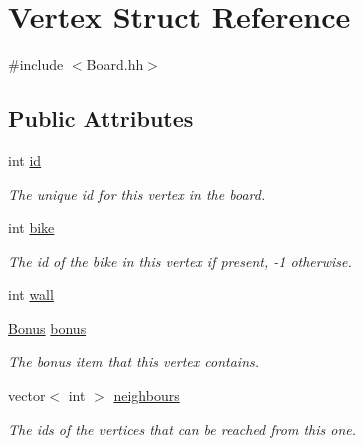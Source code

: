 \hypertarget{structVertex}{}\section{Vertex Struct Reference}
\label{structVertex}


{\ttfamily \#include $<$Board.\+hh$>$}

\subsection*{Public Attributes}
\begin{DoxyCompactItemize}
\item 
int \hyperlink{structVertex_a2e69697726190f50c7fc040fb1ddac7a}{id}\hypertarget{structVertex_a2e69697726190f50c7fc040fb1ddac7a}{}\label{structVertex_a2e69697726190f50c7fc040fb1ddac7a}

\begin{DoxyCompactList}\small\item\em The unique id for this vertex in the board. \end{DoxyCompactList}\item 
int \hyperlink{structVertex_a566d493bf66be66b624d611ef129b417}{bike}\hypertarget{structVertex_a566d493bf66be66b624d611ef129b417}{}\label{structVertex_a566d493bf66be66b624d611ef129b417}

\begin{DoxyCompactList}\small\item\em The id of the bike in this vertex if present, -\/1 otherwise. \end{DoxyCompactList}\item 
int \hyperlink{structVertex_a06820e7fc724eb7e1a3f35df08be1cc6}{wall}
\item 
\hyperlink{Board_8hh_a89fd84d2116e79c08d57dffb6d167ec2}{Bonus} \hyperlink{structVertex_abd0ead532b0acdd9420fb2f46f3e7fcf}{bonus}\hypertarget{structVertex_abd0ead532b0acdd9420fb2f46f3e7fcf}{}\label{structVertex_abd0ead532b0acdd9420fb2f46f3e7fcf}

\begin{DoxyCompactList}\small\item\em The bonus item that this vertex contains. \end{DoxyCompactList}\item 
vector$<$ int $>$ \hyperlink{structVertex_a8a836da794928c52095cb162c79cfade}{neighbours}\hypertarget{structVertex_a8a836da794928c52095cb162c79cfade}{}\label{structVertex_a8a836da794928c52095cb162c79cfade}

\begin{DoxyCompactList}\small\item\em The ids of the vertices that can be reached from this one. \end{DoxyCompactList}\end{DoxyCompactItemize}


